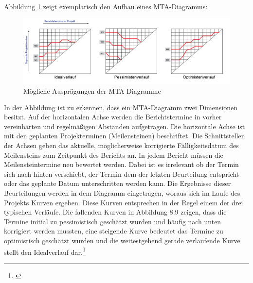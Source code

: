 Abbildung \ref{fig_MTA_diagramme} zeigt exemplarisch den Aufbau eines MTA-Diagramms:
\begin{figure}[h!]
	\centering
	\includegraphics{kapitel/gruppe4_2/bilder/mta_diagramme}
	\caption{Mögliche Ausprägungen der MTA Diagramme}
	\label{fig_MTA_diagramme}
\end{figure}

In der Abbildung ist zu erkennen, dass ein MTA-Diagramm zwei Dimensionen besitzt. Auf der horizontalen Achse werden die Berichtstermine in vorher vereinbarten und regelmäßigen Abständen aufgetragen. Die horizontale Achse ist mit den geplanten Projekterminen (Meilensteinen) beschriftet. Die Schnittstellen der Achsen geben das aktuelle, möglicherweise korrigierte Fälligkeitsdatum des Meilensteins zum Zeitpunkt des Berichts an. In jedem Bericht müssen die Meilensteintermine neu bewertet werden. Dabei ist es irrelevant ob der Termin sich nach hinten verschiebt, der Termin dem der letzten Beurteilung entspricht oder das geplante Datum unterschritten werden kann. Die Ergebnisse dieser Beurteilungen werden in dem Diagramm eingetragen, woraus sich im Laufe des Projekts Kurven ergeben. Diese Kurven entsprechen in der Regel einem der drei typischen Verläufe. Die fallenden Kurven in Abbildung 8.9 zeigen, dass die Termine initial zu pessimistisch geschätzt wurden und häufig nach unten korrigiert werden mussten, eine steigende Kurve bedeutet das Termine zu optimistisch geschätzt wurden und die weitestgehend gerade verlaufende Kurve stellt den Idealverlauf dar.\footnote{\cite{gadatsch_masterkurs_2014}}
